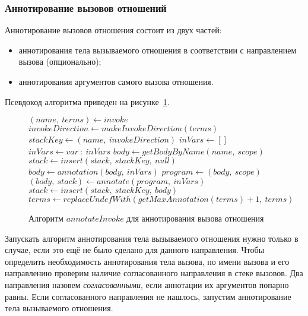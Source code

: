 
\subsubsection{Аннотирование вызовов отношений}

Аннотирование вызовов отношения состоит из двух частей:
\begin{itemize}
    \item аннотирования тела вызываемого отношения в соответствии с направлением вызова (опционально);
    \item аннотирования аргументов самого вызова отношения.
\end{itemize}
Псевдокод алгоритма приведен на рисунке~\ref{alg:annotateInvoke}.

\begin{figure}[h!]
  \begin{center}
  \begin{minipage}{1\textwidth}
\begin{algorithm}[H]
  $(name,~terms) \gets invoke$\;
  $invokeDirection \gets makeInvokeDirection(terms)$\;
  $stackKey \gets (name,~invokeDirection)$\;
   {
    $inVars \gets []$\;
     {
       {
        $inVars \gets var~:~inVars$
      }
    }
    $body \gets getBodyByName(name,~scope)$\;
    $stack \gets insert(stack,~stackKey,~null)$\;
    $body \gets annotation(body,~inVars)$\;
    $program \gets (body,~scope)$\;
    $(body,~stack) \gets annotate(program,~inVars)$\;
    $stack \gets insert(stack,~stackKey,~body)$
  }
  $terms \gets replaceUndefWith(getMaxAnnotation(terms) + 1,~terms)$\;
\end{algorithm}
  \end{minipage}
  \end{center}
  \caption{Алгоритм $annotateInvoke$ для аннотирования вызова отношения}
  \label{alg:annotateInvoke}
\end{figure}

Запускать алгоритм аннотирования тела вызываемого отношения нужно только в случае, если это ещё не было сделано для данного направления.
Чтобы определить необходимость аннотирования тела вызова, по имени вызова и его направлению проверим наличие согласованного направления в стеке вызовов.
Два направления назовем \emph{согласованными}, если аннотации их аргументов попарно равны.
Если согласованного направления не нашлось, запустим аннотирование тела вызываемого отношения.


